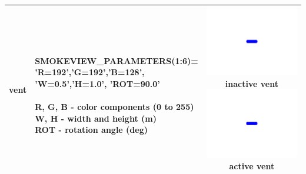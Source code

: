 \begin{longtable}[ht]{|l|l|c|}
{\ct vent} &
\parbox[c]{\boxwidth}{
\hspace{1in} \\
{\ct SMOKEVIEW\_PARAMETERS(1:6)=}\\
{\ct 'R=192','G=192','B=128',}\\
{\ct 'W=0.5','H=1.0', 'ROT=90.0'}\\ \\
{\ct R, G, B} - color components (0 to 255) \\
{\ct W, H} - width and height (m) \\
{\ct ROT} - rotation angle (deg) \\
\hspace{1in}
} &
\parbox[c]{\devicewidth}{
\vspace{0.01in}
\includegraphics[width=\devicewidth]{SCRIPT_FIGURES/vent1}
inactive vent\\
\vspace{0.01in}
\includegraphics[width=\devicewidth]{SCRIPT_FIGURES/vent2}
active vent\\
\vspace{0.01in}
}
\\ \hline
\end{longtable}


